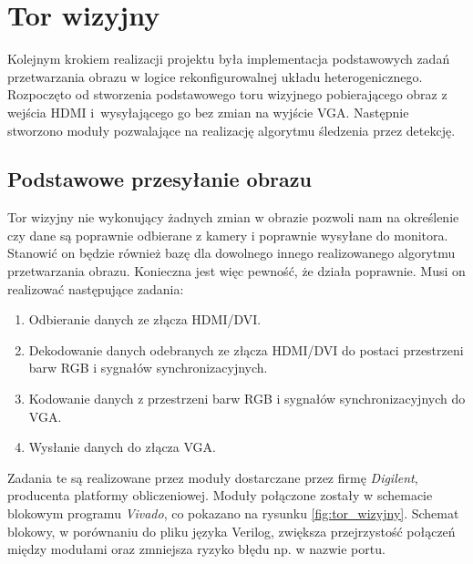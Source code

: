 \chapter{Tor wizyjny}
\label{cha:torwizyjny}

Kolejnym krokiem realizacji projektu była implementacja podstawowych zadań przetwarzania obrazu w logice rekonfigurowalnej układu heterogenicznego. 
Rozpoczęto od stworzenia podstawowego toru wizyjnego pobierającego obraz z wejścia HDMI i~wysyłającego go bez zmian na wyjście VGA. 
Następnie stworzono moduły pozwalające na realizację algorytmu śledzenia przez detekcję.

\section{Podstawowe przesyłanie obrazu}
\label{sec:podstawoweprzesylanieobrazu}
Tor wizyjny nie wykonujący żadnych zmian w obrazie pozwoli nam na określenie czy dane są poprawnie odbierane z kamery i poprawnie wysyłane do monitora. 
Stanowić on będzie również bazę dla dowolnego innego realizowanego algorytmu przetwarzania obrazu. 
Konieczna jest więc pewność, że działa poprawnie. 
Musi on realizować następujące zadania:
\begin{enumerate}
\item Odbieranie danych ze złącza HDMI/DVI.
\item Dekodowanie danych odebranych ze złącza HDMI/DVI do postaci przestrzeni barw RGB i sygnałów synchronizacyjnych.
\item Kodowanie danych z przestrzeni barw RGB i sygnałów synchronizacyjnych do VGA.
\item Wysłanie danych do złącza VGA.
\end{enumerate}
Zadania te są realizowane przez moduły dostarczane przez firmę \textit{Digilent}, producenta platformy obliczeniowej.
Moduły połączone zostały w schemacie blokowym programu \textit{Vivado}, co pokazano na rysunku \ref{fig:tor_wizyjny}.
Schemat blokowy, w porównaniu do pliku języka Verilog, zwiększa przejrzystość połączeń między modułami oraz zmniejsza ryzyko błędu np. w nazwie portu.


